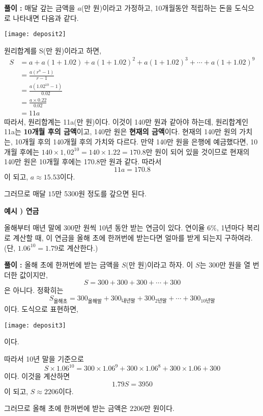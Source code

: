 \documentclass{oblivoir}
\newcounter{num}
\newcommand{\exam}[1]
{\bigskip\noindent\refstepcounter{num}\textbf{예시 \arabic{num}) #1}\par\noindent}
\begin{document}
\begin{mdframed}
\textbf{풀이 : }
매달 갚는 금액을 \(a\)(만 원)이라고 가정하고, 10개월동안 적립하는 돈을 도식으로 나타내면 다음과 같다.

\begin{center}
\texttt{[image: deposit2]}
\end{center}

원리합계를 S(만 원)이라고 하면,
\begin{align*}
S
&=a+a(1+1.02)+a(1+1.02)^2+a(1+1.02)^3+\cdots+a(1+1.02)^9\\
&=\frac{a(r^n-1)}{r-1}\\
&=\frac{a(1.02^{10}-1)}{0.02}\\
&=\frac{a\times0.22}{0.02}\\
&=11a
\end{align*}
따라서, 원리합계는 11a(만 원)이다.
이것이 140만 원과 같아야 하는데, 원리합계인 11a는 \textbf{10개월 후의 금액}이고, 140만 원은 \textbf{현재의 금액}이다.
현재의 140만 원의 가치는, 10개월 후의 140개월 후의 가치와 다르다.
만약 140만 원을 은행에 예금했다면, 10개월 후에는 \(140\times1,02^{10}=140\times 1.22=170.8\)만 원이 되어 있을 것이므로 현재의 140만 원은 10개월 후에는 170.8만 원과 같다.
따라서
\[11a=170.8\]
이 되고, \(a\approx15.53\)이다.

그러므로 매달 \(15\)만 5300원 정도를 갚으면 된다.
\end{mdframed}

\clearpage
%
\exam{연금}
올해부터 매년 말에 \(300\)만 원씩 10년 동안 받는 연금이 있다.
연이율 \(6\%\), 1년마다 복리로 계산할 때, 이 연금을 올해 초에 한꺼번에 받는다면 얼마를 받게 되는지 구하여라.
(단, \(1.06^{10}=1.79\)로 계산한다.)

\begin{mdframed}
\textbf{풀이 : }
올해 초에 한꺼번에 받는 금액을 \(S\)(만 원)이라고 하자.
이 \(S\)는 300만 원을 열 번 더한 값이지만,
\[S=300+300+300+\cdots+300\]
은 아니다. 정확히는
\[S_{올해초}=300_{올해 말}+300_{내년 말}+300_{2년 말}+\cdots+300_{10년 말}\]
이다.
도식으로 표현하면,

\begin{center}
\texttt{[image: deposit3]}
\end{center}
이다.

따라서 10년 말을 기준으로
\[S\times1.06^{10}=300\times1.06^9+300\times1.06^8+300\times1.06+300\]
이다.
이것을 계산하면
\[1.79S=3950\]
이 되고, \(S\approx2206\)이다.

그러므로 올해 초에 한꺼번에 받는 금액은 \(2206\)만 원이다.
\end{mdframed}
\end{document}

